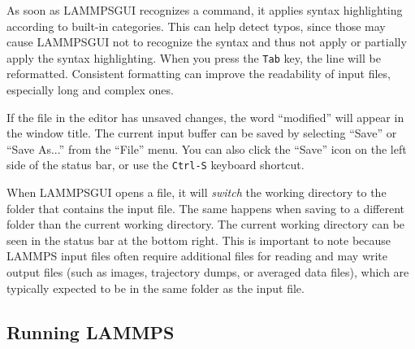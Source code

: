 \documentclass[9pt,tutorial]{livecoms}
\newcommand{\lammpsgui}{\textsf{LAMMPS\textendash GUI}}
\begin{document}
\begin{appendices}
As soon as \lammpsgui{} recognizes a command, it applies syntax
highlighting according to built-in categories.  This can help
detect typos, since those may cause \lammpsgui{} not to
recognize the syntax and thus not apply or partially apply
the syntax highlighting.  When you press the \texttt{Tab} key, the line will be
reformatted.  Consistent formatting can improve the readability of
input files, especially long and complex ones.

If the file in the editor has unsaved changes, the word
``\*modified\*'' will appear in the window title.  The current input
buffer can be saved by selecting ``Save'' or ``Save As...'' from the
``File'' menu.  You can also click the ``Save'' icon on the left side
of the status bar, or use the \texttt{Ctrl-S} keyboard shortcut.

\begin{note}
When \lammpsgui{} opens a file, it will \emph{switch} the working directory
to the folder that contains the input file.  The same happens when saving to
a different folder than the current working directory.  The current working
directory can be seen in the status bar at the bottom right.  This is important
to note because LAMMPS input files often require additional files for reading and may
write output files (such as images, trajectory dumps, or averaged data files),
which are typically expected to be in the same folder as the input file.
\end{note}


\subsection{Running LAMMPS}
\label{running-lammps-label}



\end{appendices}
\end{document}
